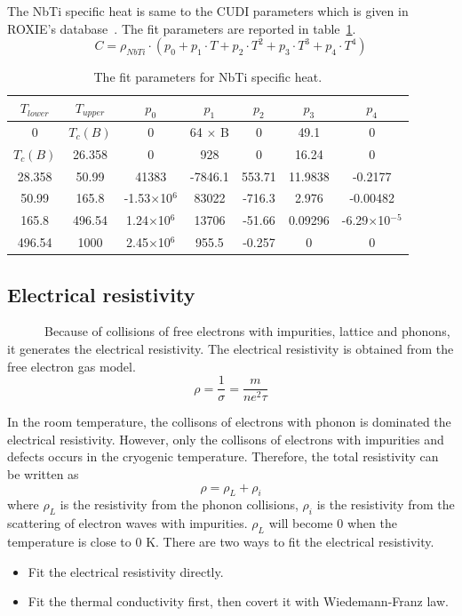 The NbTi specific heat is same to the CUDI parameters which is given in ROXIE's database~\cite{roxie}.
The fit parameters are reported in table~\ref{nbtish}.
\begin{equation}
 C = \rho_{NbTi}\cdot (p_0 + p_1 \cdot T + p_2 \cdot T^2 + p_3 \cdot T^3 + p_4 \cdot T^4)
\end{equation}
\begin{table}[H]
 \centering
 \begin{tabular}{ccccccc} \hline \hline
 $T_{lower}$ & $T_{upper}$ & $p_0$ & $p_1$ & $p_2$ & $p_3$ & $p_4$ \\ \hline
 0 & $T_c(B)$ & 0 & 64 $\times$ B & 0 & 49.1 & 0 \\
 $T_c(B)$ & 26.358 & 0 & 928 & 0 & 16.24 & 0 \\
 28.358 & 50.99 & 41383 & -7846.1 & 553.71 & 11.9838 & -0.2177 \\
 50.99 & 165.8 & -1.53$\times$10$^6$ & 83022 & -716.3 & 2.976 & -0.00482 \\
 165.8 & 496.54 & 1.24$\times$10$^6$ & 13706 & -51.66 & 0.09296 & -6.29$\times$10$^{-5}$ \\
 496.54 & 1000 & 2.45$\times$10$^6$ & 955.5 & -0.257 & 0 & 0 \\ \hline \hline
 \end{tabular}
 \caption{The fit parameters for NbTi specific heat.}
 \label{nbtish}
\end{table}

  \subsection{Electrical resistivity}
~~~~~~Because of collisions of free electrons with impurities, lattice and phonons, it generates the electrical resistivity.
The electrical resistivity is obtained from the free electron gas model.
\begin{equation}
 \rho = \frac{1}{\sigma} = \frac{m}{ne^2\tau}
\end{equation}

In the room temperature, the collisons of electrons with phonon is dominated the electrical resistivity.
However, only the collisons of electrons with impurities and defects occurs in the cryogenic temperature.
Therefore, the total resistivity can be written as
\begin{equation}
 \rho = \rho_L + \rho_i
\label{reseq}
\end{equation}
where $\rho_L$ is the resistivity from the phonon collisions, $\rho_i$ is the resistivity from the scattering of electron waves with impurities.
$\rho_L$ will become 0 when the temperature is close to 0 K.
There are two ways to fit the electrical resistivity.
\begin{itemize}
 \setlength{\itemsep}{-5pt}
 \item Fit the electrical resistivity directly.
 \item Fit the thermal conductivity first, then covert it with Wiedemann-Franz law.
\end{itemize}

